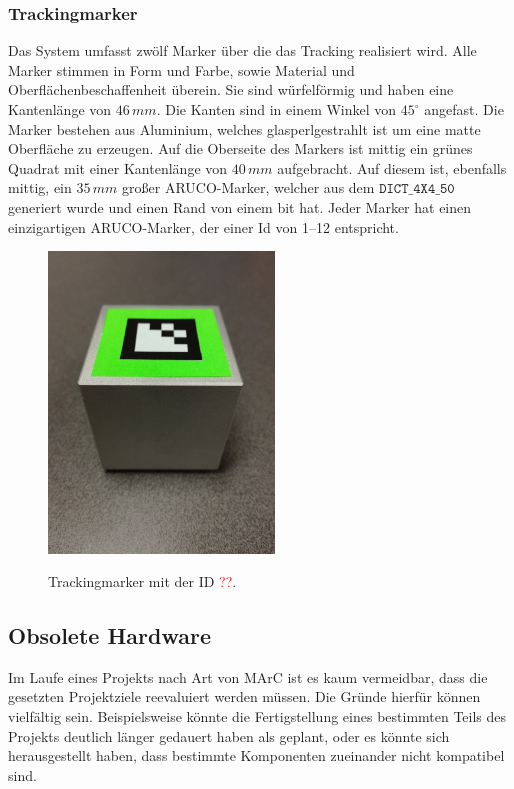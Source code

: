 \subsubsection{Trackingmarker}
Das System umfasst zwölf Marker über die das Tracking realisiert wird. Alle Marker stimmen in Form und Farbe, sowie Material und Oberflächenbeschaffenheit überein. Sie sind würfelförmig und haben eine Kantenlänge von $46\,mm$. Die Kanten sind in einem Winkel von $45^\circ$ angefast. Die Marker bestehen aus Aluminium, welches glasperlgestrahlt ist um eine matte Oberfläche zu erzeugen. Auf die Oberseite des Markers ist mittig ein grünes Quadrat mit einer Kantenlänge von $40\,mm$ aufgebracht. Auf diesem ist, ebenfalls mittig, ein $35\,mm$ großer ARUCO-Marker, welcher aus dem $\texttt{DICT\_4X4\_50}$ generiert wurde und einen Rand von einem bit hat. Jeder Marker hat einen einzigartigen ARUCO-Marker, der einer Id von 1--12 entspricht.


	\begin{figure}[H]
		\center 
		\includegraphics[trim = 0mm 280mm 0mm 150mm, clip, width=6cm]{Bilder/tracking-marker.jpg}
			\label{fig:marker}
			\caption{Trackingmarker mit der ID \textcolor{red}{??}.}
	\end{figure}
	
\subsection{Obsolete Hardware}\label{sec:obsoleteHardware}
Im Laufe eines Projekts nach Art von MArC ist es kaum vermeidbar, dass die gesetzten Projektziele reevaluiert werden müssen. Die Gründe hierfür können vielfältig sein. Beispielsweise könnte die Fertigstellung eines bestimmten Teils des Projekts deutlich länger gedauert haben als geplant, oder es könnte sich herausgestellt haben, dass bestimmte Komponenten zueinander nicht kompatibel sind.

